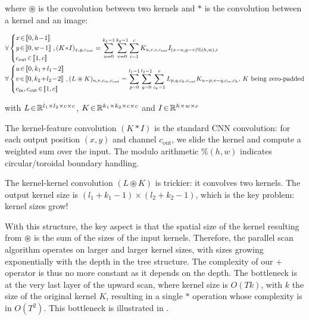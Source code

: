 \noindent where $\circledast$ is the convolution between two kernels and $\ast$ is the convolution between a kernel and an image:

\begin{align*}
    & \forall \left\{
\begin{aligned}
    &x\!\in\!\intint{0}{h\!-\!1}\\
    &y\!\in\!\intint{0}{w\!-\!1}\\
    &c_{\mathrm{out}}\!\in\!\intint{1}{c}
\end{aligned}
\right., (K\!\ast\!I)_{x,y,c_{\mathrm{out}}} = \sum_{u=0}^{k_1-1}\sum_{v=0}^{k_2-1}\sum_{i=1}^{c} K_{u,v,i,c_{\mathrm{out}}} I_{(x-u,y-v)\%(h,w),i}\\
    & \forall \left\{
\begin{aligned}
    &u\!\in\!\intint{0}{k_1\!+\!l_1\!-\!2}\\
    &v\!\in\!\intint{0}{k_2\!+\!l_2\!-\!2}\\
    &c_{\mathrm{in}},c_{\mathrm{out}}\!\in\!\intint{1}{c}
\end{aligned}
\right., (L \circledast K)_{u,v,c_{\mathrm{in}},c_{\mathrm{out}}} = \sum_{p=0}^{l_1-1}\sum_{q=0}^{l_2-1}\sum_{c_{k}=1}^{c} L_{p,q,c_{k},c_{\mathrm{out}}} K_{u-p,v-q,c_{\mathrm{in}},c_{k}}\text{, $K$ being zero-padded}\\\end{align*}

\noindent with $L\!\in\!\mathbb{R}^{l_1\times l_2\times c \times c}$, $K\!\in\!\mathbb{R}^{k_1\times k_2\times c \times c}$ and $I\!\in\!\mathbb{R}^{h \times w \times c}$

\begin{ThomasAnnotation}
The kernel-feature convolution $(K \ast I)$ is the standard CNN convolution: for each output position $(x, y)$ and channel $c_{\mathrm{out}}$, we slide the kernel and compute a weighted sum over the input. The modulo arithmetic $\%(h, w)$ indicates circular/toroidal boundary handling.

The kernel-kernel convolution $(L \circledast K)$ is trickier: it convolves two kernels. The output kernel size is $(l_1 + k_1 - 1) \times (l_2 + k_2 - 1)$, which is the key problem: kernel sizes grow!
\end{ThomasAnnotation}

With this structure, the key aspect is that the spatial size of the kernel resulting from $\circledast$ is the sum of the sizes of the input kernels. Therefore, the parallel scan algorithm operates on larger and larger kernel sizes, with sizes growing exponentially with the depth in the tree structure. The complexity of our $+$ operator is thus no more constant as it depends on the depth. The bottleneck is at the very last layer of the upward scan, where kernel size is $O(Tk)$, with $k$ the size of the original kernel $K$, resulting in a single $\ast$ operation whose complexity is in $O(T^2)$. This bottleneck is illustrated in .

